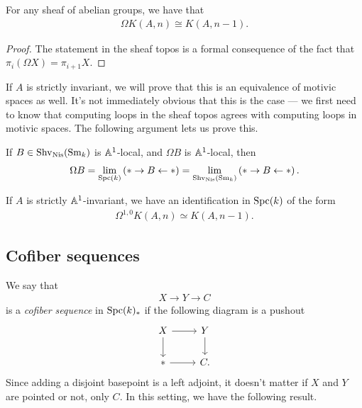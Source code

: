 \documentclass[11pt,openany]{book}
\begin{document}
\begin{proposition} For any sheaf of abelian groups, we have that
\begin{align*}
    \Omega K(A,n) \cong K(A,n-1).
\end{align*}
\end{proposition}
\begin{proof} The statement in the sheaf topos is a formal consequence of the fact that $\pi_i(\Omega X) = \pi_{i+1}X$.
\end{proof}

If $A$ is strictly invariant, we will prove that this is an equivalence of motivic spaces as well. It's not immediately obvious that this is the case --- we first need to know that computing loops in the sheaf topos agrees with computing loops in motivic spaces. The following argument lets us prove this.

\begin{remark} If $B \in \mathrm{Shv}_{\mathrm{Nis}}(\mathrm{Sm}_k)$ is $\mathbb{A}^1$-local, and $\Omega B$ is $\mathbb{A}^1$-local, then
\begin{align*}
    \Omega B = \lim_{\mathrm{Spc}(k)} \left( \ast \to B \leftarrow \ast \right) = \lim_{\mathrm{Shv}_{\mathrm{Nis}}(\mathrm{Sm}_k)} \left( \ast \to B \leftarrow \ast \right).
\end{align*}
\end{remark}

\begin{corollary}
If $A$ is strictly $\mathbb{A}^1$-invariant, we have an identification in $\mathrm{Spc}(k)$ of the form
\begin{align*}
    \Omega^{1,0} K(A,n) \simeq K(A,n-1).
\end{align*}
\end{corollary}


\subsection{Cofiber sequences}

We say that
\begin{align*}
    X \to Y \to C
\end{align*}
is a \textit{cofiber sequence} in $\mathrm{Spc}(k)_\ast$ if the following diagram is a pushout
\[ \begin{tikzcd}
    X\rar\dar & Y\dar\\
    \ast\rar & C.
\end{tikzcd} \]
Since adding a disjoint basepoint is a left adjoint, it doesn't matter if $X$ and $Y$ are pointed or not, only $C$. In this setting, we have the following result.
\end{document}
